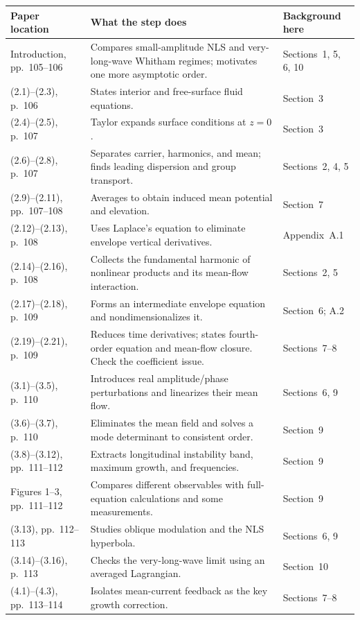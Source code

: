 \begin{longtable}{@{}p{.22\linewidth}p{.49\linewidth}p{.22\linewidth}@{}}
\toprule Paper location & What the step does & Background here\\\midrule
\endhead
Introduction, pp.~105--106 & Compares small-amplitude NLS and very-long-wave
Whitham regimes; motivates one more asymptotic order. & Sections~1, 5, 6, 10\\
(2.1)--(2.3), p.~106 & States interior and free-surface fluid equations.
& Section~3\\
(2.4)--(2.5), p.~107 & Taylor expands surface conditions at $z=0$.
& Section~3\\
(2.6)--(2.8), p.~107 & Separates carrier, harmonics, and mean; finds leading
dispersion and group transport. & Sections~2, 4, 5\\
(2.9)--(2.11), pp.~107--108 & Averages to obtain induced mean potential
and elevation. & Section~7\\
(2.12)--(2.13), p.~108 & Uses Laplace's equation to eliminate envelope
vertical derivatives. & Appendix~A.1\\
(2.14)--(2.16), p.~108 & Collects the fundamental harmonic of nonlinear
products and its mean-flow interaction. & Sections~2, 5\\
(2.17)--(2.18), p.~109 & Forms an intermediate envelope equation and
nondimensionalizes it. & Section~6; A.2\\
(2.19)--(2.21), p.~109 & Reduces time derivatives; states fourth-order
equation and mean-flow closure. Check the coefficient issue. & Sections~7--8\\
(3.1)--(3.5), p.~110 & Introduces real amplitude/phase perturbations and
linearizes their mean flow. & Sections~6, 9\\
(3.6)--(3.7), p.~110 & Eliminates the mean field and solves a mode
determinant to consistent order. & Section~9\\
(3.8)--(3.12), pp.~111--112 & Extracts longitudinal instability band,
maximum growth, and frequencies. & Section~9\\
Figures 1--3, pp.~111--112 & Compares different observables with
full-equation calculations and some measurements. & Section~9\\
(3.13), pp.~112--113 & Studies oblique modulation and the NLS hyperbola.
& Sections~6, 9\\
(3.14)--(3.16), p.~113 & Checks the very-long-wave limit using an averaged
Lagrangian. & Section~10\\
(4.1)--(4.3), pp.~113--114 & Isolates mean-current feedback as the key
growth correction. & Sections~7--8\\
\bottomrule
\end{longtable}


